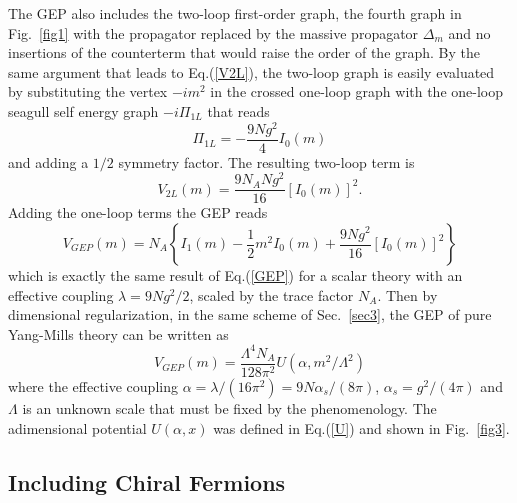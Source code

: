 \documentclass[aps,preprint]{revtex4}
\newcommand{\BE}{\begin{equation}}
\newcommand{\EE}{\end{equation}}
\begin{document}
The GEP also includes the two-loop first-order graph, the fourth graph in Fig.~\ref{fig1} with the propagator
replaced by the massive propagator $\Delta_m$ and no insertions of the counterterm that would raise
the order of the graph. By the same argument that leads to Eq.(\ref{V2L}), the two-loop graph is
easily evaluated by substituting the vertex $-im^2$ in
the crossed one-loop graph with the one-loop seagull self energy graph $-i \Pi_{1L}$ that reads\cite{genself}
\BE
\Pi_{1L}=-\frac{9Ng^2}{4} I_0 (m)
\EE
and adding a $1/2$ symmetry factor. The resulting two-loop term is
\BE
V_{2L} (m)=\frac{9N_A N g^2}{16} [I_0 (m)]^2.
\label{V2LA}
\EE
Adding the one-loop terms the GEP reads
\BE
V_{GEP}(m)=N_A\left\{I_1(m)-\frac{1}{2}m^2 I_0(m) +\frac{9 N g^2}{16}[I_0 (m)]^2\right\}
\label{GEPA}
\EE
which is exactly the same result of Eq.(\ref{GEP}) for a scalar theory with 
an effective coupling $\lambda=9 N g^2/2$, scaled by the trace factor $N_A$.
Then by dimensional regularization, in the same scheme of Sec.~\ref{sec3}, the GEP 
of pure Yang-Mills theory can be written as
\BE
V_{GEP}(m)=\frac{\Lambda^4N_A}{128\pi^2} U(\alpha, m^2/\Lambda^2)
\label{GEPYM}
\EE
where the effective coupling $\alpha=\lambda/(16\pi^2)=9 N \alpha_s/(8\pi)$,
$\alpha_s=g^2/(4\pi)$ and $\Lambda$ is an unknown scale that must be fixed by
the phenomenology. The adimensional potential $U(\alpha, x)$ was defined in Eq.(\ref{U})
and shown in Fig.~\ref{fig3}.

\subsection{Including Chiral Fermions}\label{sec42}
\end{document}
